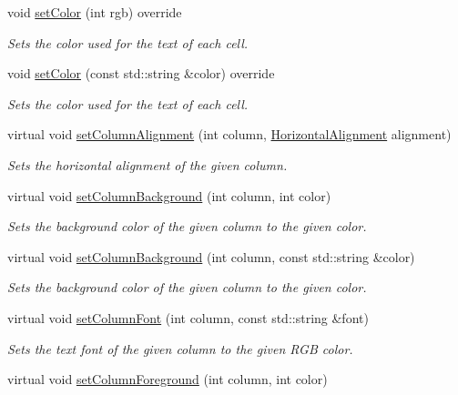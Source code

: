 \begin{DoxyCompactItemize}
void \mbox{\hyperlink{classsgl_1_1GTable_a165735fb49fa7db12602d32557cbfe0d}{set\+Color}} (int rgb) override
\begin{DoxyCompactList}\small\item\em Sets the color used for the text of each cell. \end{DoxyCompactList}\item 
void \mbox{\hyperlink{classsgl_1_1GTable_a56845b1accc47aa881d05939eef6996c}{set\+Color}} (const std\+::string \&color) override
\begin{DoxyCompactList}\small\item\em Sets the color used for the text of each cell. \end{DoxyCompactList}\item 
virtual void \mbox{\hyperlink{classsgl_1_1GTable_a84b3f42bb5d010483b78b9fd7e9c55f0}{set\+Column\+Alignment}} (int column, \mbox{\hyperlink{namespacesgl_aa00e70829e72ff16addc4d9f06fe3bc5}{Horizontal\+Alignment}} alignment)
\begin{DoxyCompactList}\small\item\em Sets the horizontal alignment of the given column. \end{DoxyCompactList}\item 
virtual void \mbox{\hyperlink{classsgl_1_1GTable_a48898e733d8ae3e285ff84d02e2cdee5}{set\+Column\+Background}} (int column, int color)
\begin{DoxyCompactList}\small\item\em Sets the background color of the given column to the given color. \end{DoxyCompactList}\item 
virtual void \mbox{\hyperlink{classsgl_1_1GTable_a37fd3b921a5fba28b84dd4dd17fa9930}{set\+Column\+Background}} (int column, const std\+::string \&color)
\begin{DoxyCompactList}\small\item\em Sets the background color of the given column to the given color. \end{DoxyCompactList}\item 
virtual void \mbox{\hyperlink{classsgl_1_1GTable_a0294ee7cb1af024bc77371f27d877164}{set\+Column\+Font}} (int column, const std\+::string \&font)
\begin{DoxyCompactList}\small\item\em Sets the text font of the given column to the given R\+GB color. \end{DoxyCompactList}\item 
virtual void \mbox{\hyperlink{classsgl_1_1GTable_aa616c02b04beb6ca757dec04f46814b0}{set\+Column\+Foreground}} (int column, int color)

\end{DoxyCompactItemize}
